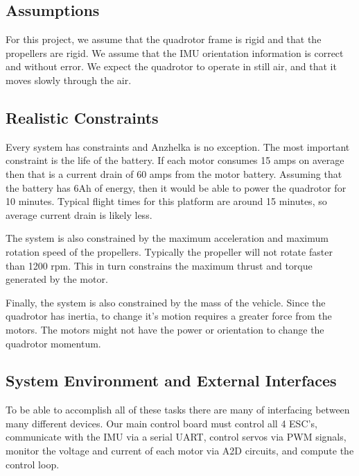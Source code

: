 \documentclass{article}
\numberwithin{equation}{section} %
\begin{document}
\subsection{Assumptions}
For this project, we assume that the quadrotor frame is rigid and that the propellers are rigid. We assume that the IMU orientation information is correct and without error. We expect the quadrotor to operate in still air, and that it moves slowly through the air.

\subsection{Realistic Constraints}
Every system has constraints and Anzhelka is no exception. The most important constraint is the life of the battery. If each motor consumes 15 amps on average then that is a current drain of 60 amps from the motor battery. Assuming that the battery has 6Ah of energy, then it would be able to power the quadrotor for 10 minutes. Typical flight times for this platform are around 15 minutes, so average current drain is likely less.

The system is also constrained by the maximum acceleration and maximum rotation speed of the propellers. Typically the propeller will not rotate faster than 1200 rpm. This in turn constrains the maximum thrust and torque generated by the motor.

Finally, the system is also constrained by the mass of the vehicle. Since the quadrotor has inertia, to change it's motion requires a greater force from the motors. The motors might not have the power or orientation to change the quadrotor momentum.


\subsection{System Environment and External Interfaces}

To be able to accomplish all of these tasks there are many of interfacing between many different devices. Our main control board must control all 4 ESC's, communicate with the IMU via a serial UART, control servos via PWM signals, monitor the voltage and current of each motor via A2D circuits, and compute the control loop.
\end{document}

